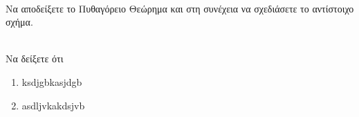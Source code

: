 \documentclass[a4paper,12pt]{examsgr}
\begin{document}
\schoolbasic\\
\thema 
Να αποδείξετε το Πυθαγόρειο Θεώρημα και στη συνέχεια να σχεδιάσετε το  αντίστοιχο σχήμα. 

\\

\thema
Να δείξετε ότι
\begin{enumerate}
\item ksdjgbkasjdgb 
\item asdljvkakdsjvb  
\end{enumerate}



\schoolfinish
\end{document}
